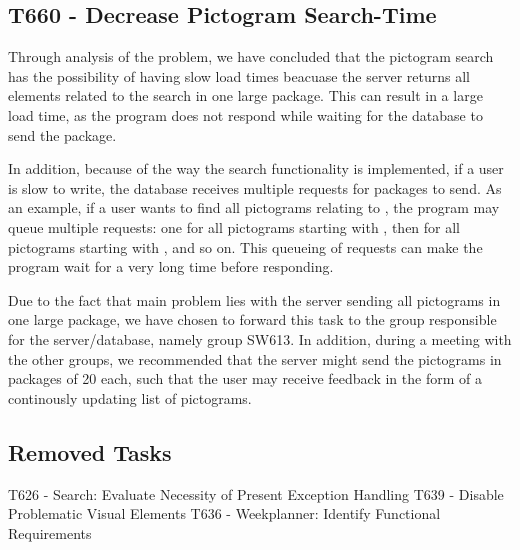 \subsection{T660 - Decrease Pictogram Search-Time}
Through analysis of the problem, we have concluded that the pictogram search has
the possibility of having slow load times beacuase the server returns all
elements related to the search in one large package. This can result in a large
load time, as the program does not respond while waiting for the database to
send the package. \nl

In addition, because of the way the search functionality is
implemented, if a user is slow to write, the database receives multiple requests
for packages to send. As an example, if a user wants to find all pictograms
relating to , the program may queue multiple requests: one for
all pictograms starting with , then for all pictograms starting with
, and so on. This queueing of requests can make the program wait for a
very long time before responding.\nl

Due to the fact that main problem lies with the server sending all pictograms in
one large package, we have chosen to forward this task to the group responsible
for the server/database, namely group SW613. In addition, during a meeting with
the other groups, we recommended that the server might send the pictograms in
packages of 20 each, such that the user may receive feedback in the form of a
continously updating list of pictograms.
 
\subsection{Removed Tasks}
T626 - Search: Evaluate Necessity of Present Exception Handling\nl
T639 - Disable Problematic Visual Elements \nl
T636 - Weekplanner: Identify Functional Requirements \nl

